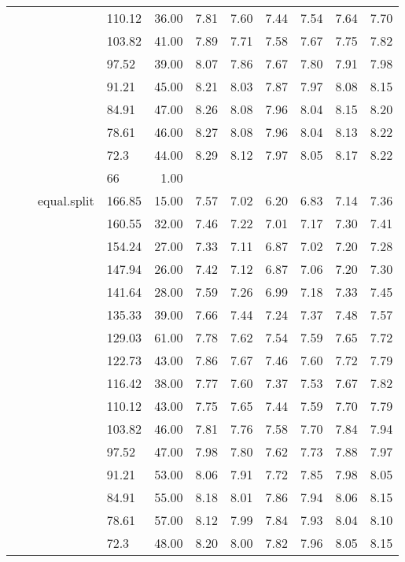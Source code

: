 \begin{longtable}{llllrrrrrrr}
   &  &  & 110.12 & 36.00 & 7.81 & 7.60 & 7.44 & 7.54 & 7.64 & 7.70 \\ 
   &  &  & 103.82 & 41.00 & 7.89 & 7.71 & 7.58 & 7.67 & 7.75 & 7.82 \\ 
   &  &  & 97.52 & 39.00 & 8.07 & 7.86 & 7.67 & 7.80 & 7.91 & 7.98 \\ 
   &  &  & 91.21 & 45.00 & 8.21 & 8.03 & 7.87 & 7.97 & 8.08 & 8.15 \\ 
   &  &  & 84.91 & 47.00 & 8.26 & 8.08 & 7.96 & 8.04 & 8.15 & 8.20 \\ 
   &  &  & 78.61 & 46.00 & 8.27 & 8.08 & 7.96 & 8.04 & 8.13 & 8.22 \\ 
   &  &  & 72.3 & 44.00 & 8.29 & 8.12 & 7.97 & 8.05 & 8.17 & 8.22 \\ 
   &  &  & 66 & 1.00 &  &  &  &  &  &  \\ 
   &  & equal.split & 166.85 & 15.00 & 7.57 & 7.02 & 6.20 & 6.83 & 7.14 & 7.36 \\ 
   &  &  & 160.55 & 32.00 & 7.46 & 7.22 & 7.01 & 7.17 & 7.30 & 7.41 \\ 
   &  &  & 154.24 & 27.00 & 7.33 & 7.11 & 6.87 & 7.02 & 7.20 & 7.28 \\ 
   &  &  & 147.94 & 26.00 & 7.42 & 7.12 & 6.87 & 7.06 & 7.20 & 7.30 \\ 
   &  &  & 141.64 & 28.00 & 7.59 & 7.26 & 6.99 & 7.18 & 7.33 & 7.45 \\ 
   &  &  & 135.33 & 39.00 & 7.66 & 7.44 & 7.24 & 7.37 & 7.48 & 7.57 \\ 
   &  &  & 129.03 & 61.00 & 7.78 & 7.62 & 7.54 & 7.59 & 7.65 & 7.72 \\ 
   &  &  & 122.73 & 43.00 & 7.86 & 7.67 & 7.46 & 7.60 & 7.72 & 7.79 \\ 
   &  &  & 116.42 & 38.00 & 7.77 & 7.60 & 7.37 & 7.53 & 7.67 & 7.82 \\ 
   &  &  & 110.12 & 43.00 & 7.75 & 7.65 & 7.44 & 7.59 & 7.70 & 7.79 \\ 
   &  &  & 103.82 & 46.00 & 7.81 & 7.76 & 7.58 & 7.70 & 7.84 & 7.94 \\ 
   &  &  & 97.52 & 47.00 & 7.98 & 7.80 & 7.62 & 7.73 & 7.88 & 7.97 \\ 
   &  &  & 91.21 & 53.00 & 8.06 & 7.91 & 7.72 & 7.85 & 7.98 & 8.05 \\ 
   &  &  & 84.91 & 55.00 & 8.18 & 8.01 & 7.86 & 7.94 & 8.06 & 8.15 \\ 
   &  &  & 78.61 & 57.00 & 8.12 & 7.99 & 7.84 & 7.93 & 8.04 & 8.10 \\ 
   &  &  & 72.3 & 48.00 & 8.20 & 8.00 & 7.82 & 7.96 & 8.05 & 8.15 \\ 

\end{longtable}
